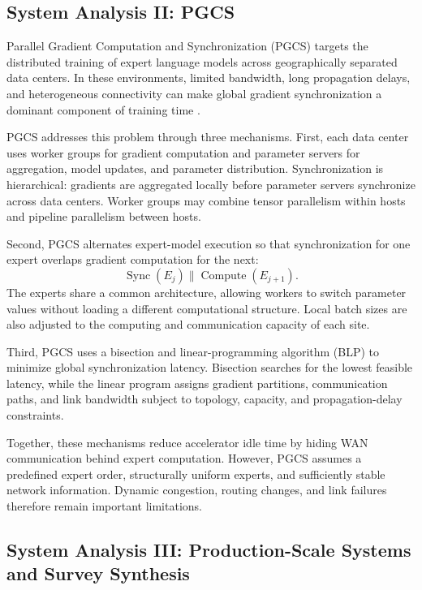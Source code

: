 \documentclass[11pt,journal,final, onecolumn]{IEEEtran}
\begin{document}
\subsection{System Analysis II: PGCS}
\label{subsec:pgcs-analysis}

Parallel Gradient Computation and Synchronization (PGCS) targets the
distributed training of expert language models across geographically separated
data centers. In these environments, limited bandwidth, long propagation
delays, and heterogeneous connectivity can make global gradient synchronization
a dominant component of training time
\cite{ParallelGradientComputationandSynchronization}.

PGCS addresses this problem through three mechanisms. First, each data center
uses worker groups for gradient computation and parameter servers for
aggregation, model updates, and parameter distribution. Synchronization is
hierarchical: gradients are aggregated locally before parameter servers
synchronize across data centers. Worker groups may combine tensor parallelism
within hosts and pipeline parallelism between hosts.

Second, PGCS alternates expert-model execution so that synchronization for one
expert overlaps gradient computation for the next:
\[
    \operatorname{Sync}(E_j)
    \parallel
    \operatorname{Compute}(E_{j+1}).
\]
The experts share a common architecture, allowing workers to switch parameter
values without loading a different computational structure. Local batch sizes
are also adjusted to the computing and communication capacity of each site.

Third, PGCS uses a bisection and linear-programming algorithm (BLP) to minimize
global synchronization latency. Bisection searches for the lowest feasible
latency, while the linear program assigns gradient partitions, communication
paths, and link bandwidth subject to topology, capacity, and propagation-delay
constraints.

Together, these mechanisms reduce accelerator idle time by hiding WAN
communication behind expert computation. However, PGCS assumes a predefined
expert order, structurally uniform experts, and sufficiently stable network
information. Dynamic congestion, routing changes, and link failures therefore
remain important limitations.

\subsection{System Analysis III: Production-Scale Systems and Survey Synthesis}
\label{subsec:production-survey-analysis}
\end{document}
